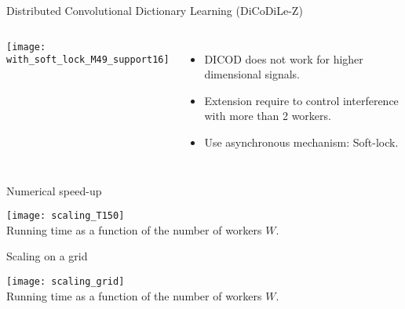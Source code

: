 \documentclass[main_dicodile]{subfiles}
\begin{document}

\begin{frame}{Distributed Convolutional Dictionary Learning (DiCoDiLe-Z)\\}

\begin{columns}[c]
    \texttt{[image: with\_soft\_lock\_M49\_support16]}
    \begin{itemize}\itemsep1em
        \item DICOD does not work for higher dimensional signals.
        \item Extension require to control interference with more than 2 workers. 
        \item Use asynchronous mechanism: Soft-lock.
    \end{itemize}
\end{columns}

\end{frame}


\begin{frame}{Numerical speed-up}

\centering
\texttt{[image: scaling\_T150]}
\\
\large Running time as a function of the number of workers $W$.

\end{frame}


\begin{frame}{Scaling on a grid}

\centering
\texttt{[image: scaling\_grid]}
\\
\large Running time as a function of the number of workers $W$.

\end{frame}
\end{document}
